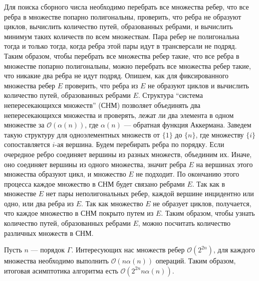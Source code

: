 \documentclass[a4paper,fleqn,12pt,top=0pt]{article}
\theoremstyle{plain}
\theoremstyle{definition}
\theoremstyle{remark}
\begin{document}
Для поиска сборного числа необходимо перебрать все множества ребер, что все ребра в множестве попарно полигональны, проверить, что ребра не образуют циклов, вычислить количество путей, образованных ребрами, и вычислить минимум таких количеств по всем множествам. Пара ребер не полигональна тогда и только тогда, когда ребра этой пары идут в трансверсали не подряд. Таким образом, чтобы перебрать все множества ребер такие, что все ребра в множестве попарно полигональны, можно перебрать все множества ребер такие, что никакие два ребра не идут подряд. Опишем, как для фиксированного множества ребер $E$ проверить, что ребра из $E$ не образуют циклов и вычислить количество путей, образованных ребрами $E$. Структура ``система непересекающихся множеств''\cite{dsu} (СНМ) позволяет объединять два непересекающихся множества и проверять, лежат ли два элемента в одном множестве за $\mathcal{O}(\alpha(n))$, где $\alpha(n)$ --- обратная функция Аккермана. Заведем такую структуру для одноэлементных множеств от $\{1\}$ до $\{n\}$, где множеству $\{i\}$ сопоставляется $i$-ая вершина. Будем перебирать ребра по порядку. Если очередное ребро соединяет вершины из разных множеств, объединим их. Иначе, оно соединяет вершины из одного множества, значит ребра $E$ на вершинах этого множества образуют цикл, и множество $E$ не подходит. По окончанию этого процесса каждое множество в СНМ будет связано ребрами $E$. Так как в множестве $E$ нет пары неполигональных ребер, каждой вершине инцидентно или одно, или два ребра из $E$. Так как множество $E$ не образует циклов, получается, что каждое множество в СНМ покрыто путем из $E$. Таким образом, чтобы узнать количество путей, образованных ребрами $E$, можно посчитать количество различных множеств в СНМ. 

Пусть $n$ --- порядок $\Gamma$. Интересующих нас множеств ребер $\mathcal{O}(2^{2n})$, для каждого множества необходимо выполнить $\mathcal{O}(n \alpha(n))$ операций. Таким образом, итоговая асимптотика алгоритма есть $\mathcal{O}(2^{2n} n \alpha(n))$.
\end{document}

